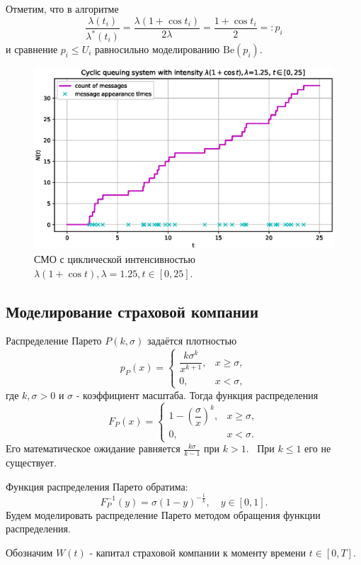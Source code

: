 \documentclass[11pt]{report}
\begin{document}
Отметим, что в алгоритме
$$
\frac{\lambda(t_i)}{\lambda^*(t_i)} = \frac{\lambda(1+\cos t_i)}{2\lambda} = \frac{1 + \cos t_i}{2} =: p_i
$$
и сравнение $p_i \leqslant U_i$ равносильно моделированию $\mathrm{Be}(p_i)$.

\begin{figure}[H]
    \centering
    \includegraphics[width=0.9\linewidth]{images/qs-cyclic.eps}
    \caption{СМО с циклической интенсивностью $\lambda(1+\cos t), \lambda=1.25, t\in[0,25]$.}
    \label{fig:qs-cyclic}
\end{figure}

\subsection{Моделирование страховой компании}

Распределение Парето $P(k,\sigma)$ задаётся плотностью
$$
p_P(x) = \begin{cases}
\dfrac{k\sigma^k}{x^{k+1}}, & x\geqslant \sigma, \\
0, & x < \sigma,
\end{cases}
$$
где $k,\sigma > 0$ и $\sigma$ - коэффициент масштаба. Тогда функция распределения
$$
F_P(x) =\begin{cases}
1 - \left(\dfrac{\sigma}{x}\right)^k, & x\geqslant \sigma, \\
0, & x < \sigma.
\end{cases}
$$
Его математическое ожидание равняется $\frac{k\sigma}{k-1}$ при $k > 1$. \
При $k \leqslant 1$ его не существует.

Функция распределения Парето обратима:
$$
F^{-1}_P(y) = \sigma(1-y)^{-\frac{1}{k}},\quad y\in[0,1].
$$
Будем моделировать распределение Парето методом обращения функции распределения.

Обозначим $W(t)$ - капитал страховой компании к моменту времени $t\in[0,T]$.
\end{document}
